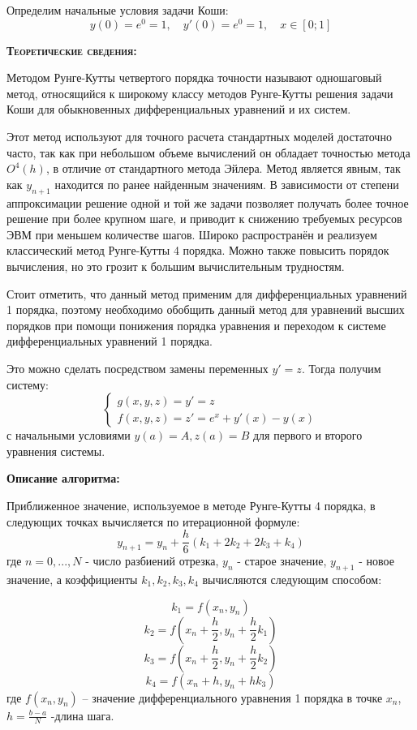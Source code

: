 \documentclass [12pt]{article}
\begin{document}
Определим начальные условия задачи Коши: $$ y(0)=e^0=1, \quad y'(0)=e^0=1, \quad x \in [0;1] $$

\textsc{\textbf{Теоретические сведения:}}

Методом Рунге-Кутты четвертого порядка точности называют одношаговый метод, относящийся к широкому классу методов Рунге-Кутты решения задачи Коши для обыкновенных дифференциальных уравнений и их систем.

Этот метод используют для точного расчета стандартных моделей достаточно часто, так как при небольшом объеме вычислений он обладает точностью метода $O^4(h)$, в отличие от стандартного метода Эйлера. Метод является явным, так как $y_{n+1}$ находится по ранее найденным значениям. В зависимости от степени аппроксимации решение одной и той же задачи позволяет получать более точное решение при более крупном шаге, и  приводит к снижению требуемых ресурсов ЭВМ при меньшем количестве шагов. Широко распространён и реализуем классический метод Рунге-Кутты 4 порядка. Можно также повысить порядок вычисления, но это грозит к большим вычислительным трудностям. 

Стоит отметить, что данный метод применим для дифференциальных уравнений 1 порядка, поэтому необходимо обобщить данный метод для уравнений высших порядков при помощи понижения порядка уравнения и переходом к системе дифференциальных уравнений 1 порядка.

Это можно сделать посредством замены переменных $y'=z$. Тогда получим систему:
\begin{equation*}
\begin{cases}
g(x,y,z) = y' = z \\
f(x,y,z) = z' = e^x + y'(x)-y(x)
\end{cases}
\end{equation*}
с начальными условиями $ y(a)=A,  z(a)=B $ для первого и второго уравнения системы.

\textbf{Описание алгоритма:}

Приближенное значение, используемое в методе Рунге-Кутты 4 порядка, в следующих точках вычисляется по итерационной формуле:
$$y_{n+1}=y_{n}+\frac{h}{6}(k_{1}+2k_{2}+2k_{3}+k_{4})	$$ где $n=0,...,N$ - число разбиений отрезка, $y_{n}$ - старое значение, $y_{n+1}$ - новое значение, а коэффициенты $k_{1},k_{2},k_{3},k_{4}$ вычисляются следующим способом:

$$k_1=f(x_n,y_n)$$
$$k_2=f(x_n+\frac{h}{2},y_n+\frac{h}{2}k_1)$$
$$k_3=f(x_n+\frac{h}{2},y_n+\frac{h}{2}k_2)$$
$$k_4=f(x_n+h,y_n+hk_3)$$
где $f(x_n,y_n)$ – значение дифференциального уравнения 1 порядка в точке $x_n$, $h=\frac{b-a}{N}$ -длина шага.
\end{document}
